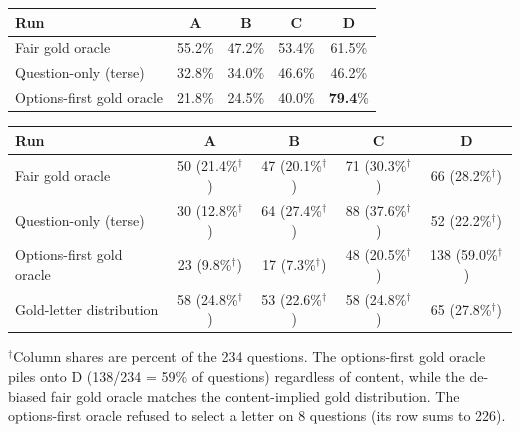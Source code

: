 \begin{subtable}{\linewidth}
\centering
\caption{Per-gold-letter accuracy}
\small
\begin{tabular}{lcccc}
\toprule
Run & A & B & C & D \\
\midrule
Fair gold oracle & 55.2\% & 47.2\% & 53.4\% & 61.5\% \\
Question-only (terse) & 32.8\% & 34.0\% & 46.6\% & 46.2\% \\
Options-first gold oracle & 21.8\% & 24.5\% & 40.0\% & \textbf{79.4}\% \\
\bottomrule
\end{tabular}
\end{subtable}
\vspace{6pt}
\begin{subtable}{\linewidth}
\centering
\caption{Selected-letter distribution}
\small
\begin{tabular}{lcccc}
\toprule
Run & A & B & C & D \\
\midrule
Fair gold oracle & 50 (21.4\%$^{\dagger}$) & 47 (20.1\%$^{\dagger}$) & 71 (30.3\%$^{\dagger}$) & 66 (28.2\%$^{\dagger}$) \\
Question-only (terse) & 30 (12.8\%$^{\dagger}$) & 64 (27.4\%$^{\dagger}$) & 88 (37.6\%$^{\dagger}$) & 52 (22.2\%$^{\dagger}$) \\
Options-first gold oracle & 23 (9.8\%$^{\dagger}$) & 17 (7.3\%$^{\dagger}$) & 48 (20.5\%$^{\dagger}$) & 138 (59.0\%$^{\dagger}$) \\
Gold-letter distribution & 58 (24.8\%$^{\dagger}$) & 53 (22.6\%$^{\dagger}$) & 58 (24.8\%$^{\dagger}$) & 65 (27.8\%$^{\dagger}$) \\
\bottomrule
\end{tabular}
\end{subtable}
\vspace{2pt}\begin{scriptsize}
 $^{\dagger}$Column shares are percent of the 234 questions. The options-first gold oracle piles onto D (138/234 = 59\% of questions) regardless of content, while the de-biased fair gold oracle matches the content-implied gold distribution. The options-first oracle refused to select a letter on 8 questions (its row sums to 226).
\end{scriptsize}
